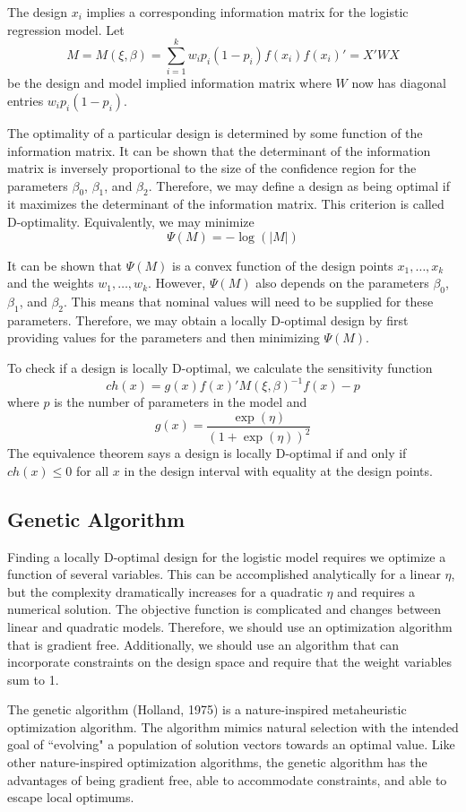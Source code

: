 \documentclass[11pt,a4paper]{article}
\begin{document}
The design $x_i$ implies a corresponding information matrix for the logistic regression model. Let
$$
M = M(\xi, \beta) = \sum_{i=1}^k w_ip_i (1-p_i) f(x_i) f(x_i)' = X'WX
$$
be the design and model implied information matrix where $W$ now has diagonal entries $w_i p_i (1-p_i)$.

The optimality of a particular design is determined by some function of the information matrix. It can be shown that the determinant of the information matrix is inversely proportional to the size of the confidence region for the parameters $\beta_0$, $\beta_1$, and $\beta_2$. Therefore, we may define a design as being optimal if it maximizes the determinant of the information matrix. This criterion is called D-optimality. Equivalently, we may minimize
$$
\Psi(M) = -\log(|M|)
$$

It can be shown that $\Psi(M)$ is a convex function of the design points $x_1, \dots, x_k$ and  the weights $w_1, \dots, w_k$. However, $\Psi(M)$ also depends on the parameters $\beta_0$, $\beta_1$, and $\beta_2$. This means that nominal values will need to be supplied for these parameters. Therefore, we may obtain a locally D-optimal design by first providing values for the parameters and then minimizing $\Psi(M)$.

To check if a design is locally D-optimal, we calculate the sensitivity function
$$
ch(x) = g(x) f(x)'M(\xi, \beta)^{-1} f(x) - p
$$
where $p$ is the number of parameters in the model and
$$
g(x) = \frac{\exp(\eta)}{(1+\exp(\eta))^2}
$$
The equivalence theorem says a design is locally D-optimal if and only if $ch(x) \leq 0 $ for all $x$ in the design interval with equality at the design points.


\subsection{Genetic Algorithm}
Finding a locally D-optimal design for the logistic model requires we optimize a function of several variables. This can be accomplished analytically for a linear $\eta$, but the complexity dramatically increases for a quadratic $\eta$ and requires a numerical solution. The objective function is complicated and changes between linear and quadratic models. Therefore, we should use an optimization algorithm that is gradient free. Additionally, we should use an algorithm that can incorporate constraints on the design space and require that the weight variables sum to 1.

The genetic algorithm (Holland, 1975) is a nature-inspired metaheuristic optimization algorithm. The algorithm mimics natural selection with the intended goal of ``evolving" a population of solution vectors towards an optimal value. Like other nature-inspired optimization algorithms, the genetic algorithm has the advantages of being gradient free, able to accommodate constraints, and able to escape local optimums. 
\end{document}
